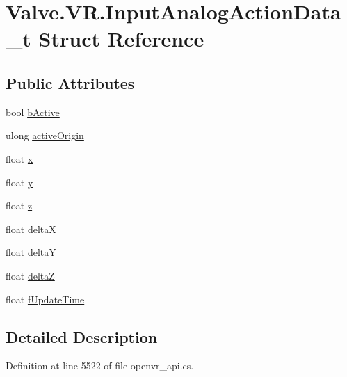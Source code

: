 \hypertarget{struct_valve_1_1_v_r_1_1_input_analog_action_data__t}{}\section{Valve.\+V\+R.\+Input\+Analog\+Action\+Data\+\_\+t Struct Reference}
\label{struct_valve_1_1_v_r_1_1_input_analog_action_data__t}
\subsection*{Public Attributes}
\begin{DoxyCompactItemize}
\item 
bool \mbox{\hyperlink{struct_valve_1_1_v_r_1_1_input_analog_action_data__t_a8c0aed60bc912cbf922039240bb0744d}{b\+Active}}
\item 
ulong \mbox{\hyperlink{struct_valve_1_1_v_r_1_1_input_analog_action_data__t_afe381e1e3da249a8cf92d8c5d7ebb18d}{active\+Origin}}
\item 
float \mbox{\hyperlink{struct_valve_1_1_v_r_1_1_input_analog_action_data__t_aedb24a586d83e3c15feb7fae7c54c9ed}{x}}
\item 
float \mbox{\hyperlink{struct_valve_1_1_v_r_1_1_input_analog_action_data__t_aafaa2145f9aaf619ccf56f781df522e0}{y}}
\item 
float \mbox{\hyperlink{struct_valve_1_1_v_r_1_1_input_analog_action_data__t_a047177250626bdbaaf1c9686c0fe951b}{z}}
\item 
float \mbox{\hyperlink{struct_valve_1_1_v_r_1_1_input_analog_action_data__t_af9a3605f6ae4eeb913a39f75c6fae7eb}{deltaX}}
\item 
float \mbox{\hyperlink{struct_valve_1_1_v_r_1_1_input_analog_action_data__t_a79087c086c9916e83e0f7515a04edb1f}{deltaY}}
\item 
float \mbox{\hyperlink{struct_valve_1_1_v_r_1_1_input_analog_action_data__t_a8944547dd6640b11a568a9f33881f703}{deltaZ}}
\item 
float \mbox{\hyperlink{struct_valve_1_1_v_r_1_1_input_analog_action_data__t_a2c19f4e38197f04d41fe28d3a10c7a65}{f\+Update\+Time}}
\end{DoxyCompactItemize}


\subsection{Detailed Description}


Definition at line 5522 of file openvr\+\_\+api.\+cs.



